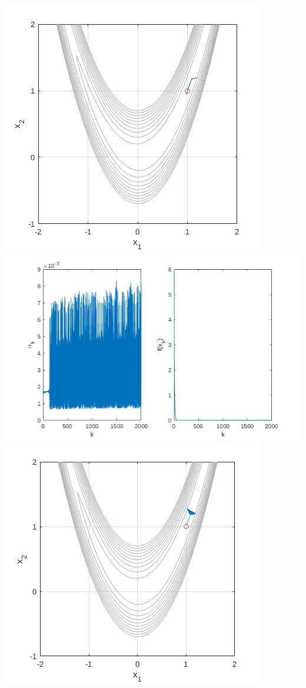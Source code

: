 \documentclass{article}
\begin{document}
\includegraphics[width=\linewidth]{a9_easy_bfgs.jpg}
\includegraphics[width=\linewidth]{a9_easy_sd_a_f.jpg}
\includegraphics[width=\linewidth]{a9_easy_sd.jpg}
\end{document}
